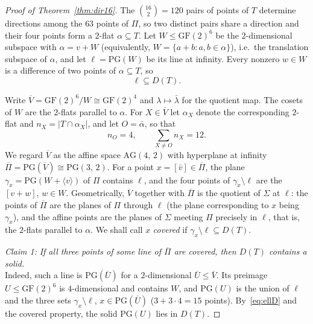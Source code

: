 \documentclass[10pt,a4paper]{amsart}
\newcommand{\AG}[2]{\mathrm{AG}(#1,\,#2)}
\newcommand{\GF}[1]{\mathrm{GF}(#1)}
\newcommand{\PGv}[1]{\mathrm{PG}(#1)}
\newcommand{\PG}[2]{\mathrm{PG}(#1,\,#2)}
\newcommand{\la}{\lambda}
\begin{document}
\begin{proof}[Proof of Theorem~\ref{thm:dir16}]
The $\binom{16}2=120$ pairs of points of $T$ determine directions among the $63$ points of $\Pi$, so two distinct pairs share a direction and their four points form a $2$-flat $\alpha\subseteq T$.  Let $W\le\GF2^6$ be the $2$-dimensional subspace with $\alpha=v+W$ (equivalently, $W=\{a+b:a,b\in\alpha\}$), i.e.\ the translation subspace of $\alpha$, and let $\ell=\PGv{W}$ be its line at infinity.  Every nonzero $w\in W$ is a difference of two points of $\alpha\subseteq T$, so
\begin{equation}\label{eq:ellD}
\ell\subseteq D(T).
\end{equation}

\smallskip
Write $\overline V=\GF2^6/W\cong\GF2^4$ and $\la\mapsto\bar\la$ for the quotient map.  The cosets of $W$ are the $2$-flats parallel to $\alpha$. For $X\in\overline V$ let $\alpha_X$ denote the corresponding $2$-flat and $n_X=|T\cap\alpha_X|$, and let $O=\bar\alpha$, so that
\begin{equation}\label{eq:twelve}
n_O=4,\qquad \sum_{X\neq O}n_X=12 .
\end{equation}
We regard $\overline V$ as the affine space $\AG42$ with hyperplane at infinity $\overline\Pi=\PGv{\overline V}\cong\PG32$.  For a point $x=[\bar v]\in\overline\Pi$, the plane $\gamma_x=\PGv{W+\langle v\rangle}$ of $\Pi$ contains $\ell$, and the four points of $\gamma_x\setminus\ell$ are the $[v+w]$, $w\in W$.  Geometrically, $\overline V$ together with $\overline\Pi$ is the quotient of $\Sigma$ at $\ell$: the points of $\overline\Pi$ are the planes of $\Pi$ through $\ell$ (the plane corresponding to $x$ being $\gamma_x$), and the affine points are the planes of $\Sigma$ meeting $\Pi$ precisely in $\ell$, that is, the $2$-flats parallel to $\alpha$.  We shall call $x$ \textit{covered} if $\gamma_x\setminus\ell\subseteq D(T)$.

\smallskip
\noindent\textit{Claim 1:}  \textit{If all three points of some line of $\overline\Pi$ are covered, then $D(T)$ contains a solid.}\\ 
Indeed, such a line is $\PGv{\overline U}$ for a $2$-dimensional $\overline U\le\overline V$.  Its preimage $U\le\GF2^6$ is $4$-dimensional and contains $W$, and $\PGv U$ is the union of $\ell$ and the three sets $\gamma_x\setminus\ell$, $x\in\PGv{\overline U}$ ($3+3\cdot4=15$ points).  By~\eqref{eq:ellD} and the covered property, the solid $\PGv U$ lies in $D(T)$.


\end{proof}
\end{document}
